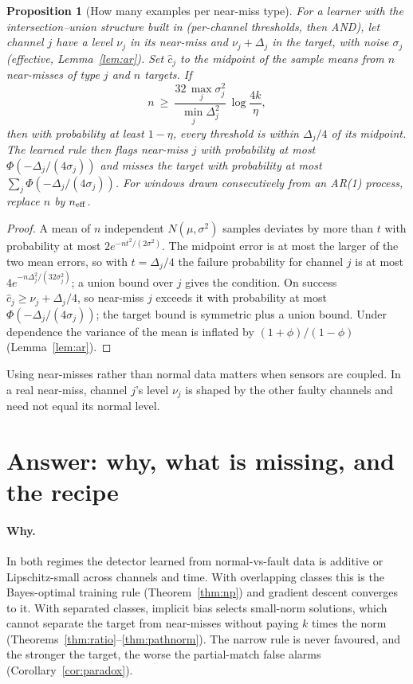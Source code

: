 \documentclass[11pt]{article}
\newtheorem{proposition}[theorem]{Proposition}
\theoremstyle{definition}
\theoremstyle{remark}
\newcommand{\1}{\mathbf{1}}
\begin{document}
\begin{proposition}[How many examples per near-miss type]\label{prop:samples}
For a learner with the intersection--union structure built in (per-channel thresholds, then AND), let channel $j$ have a level $\nu_j$ in its near-miss and $\nu_j+\Delta_j$ in the target, with noise $\sigma_j$ (effective, Lemma~\ref{lem:ar}). Set $\hat c_j$ to the midpoint of the sample means from $n$ near-misses of type $j$ and $n$ targets. If
\[
n\ \ge\ \frac{32\,\max_j\sigma_j^2}{\min_j\Delta_j^2}\,\log\frac{4k}{\eta},
\]
then with probability at least $1-\eta$, every threshold is within $\Delta_j/4$ of its midpoint. The learned rule then flags near-miss $j$ with probability at most $\Phi(-\Delta_j/(4\sigma_j))$ and misses the target with probability at most $\sum_j\Phi(-\Delta_j/(4\sigma_j))$. For windows drawn consecutively from an AR(1) process, replace $n$ by $n_{\rm eff}$.
\end{proposition}
\begin{proof}
A mean of $n$ independent $N(\mu,\sigma^2)$ samples deviates by more than $t$ with probability at most $2e^{-nt^2/(2\sigma^2)}$. The midpoint error is at most the larger of the two mean errors, so with $t=\Delta_j/4$ the failure probability for channel $j$ is at most $4e^{-n\Delta_j^2/(32\sigma_j^2)}$; a union bound over $j$ gives the condition. On success $\hat c_j\ge\nu_j+\Delta_j/4$, so near-miss $j$ exceeds it with probability at most $\Phi(-\Delta_j/(4\sigma_j))$; the target bound is symmetric plus a union bound. Under dependence the variance of the mean is inflated by $(1+\phi)/(1-\phi)$ (Lemma~\ref{lem:ar}).
\end{proof}
Using near-misses rather than normal data matters when sensors are coupled. In a real near-miss, channel $j$'s level $\nu_j$ is shaped by the other faulty channels and need not equal its normal level.

\section{Answer: why, what is missing, and the recipe}
\paragraph{Why.} In both regimes the detector learned from normal-vs-fault data is additive or Lipschitz-small across channels and time. With overlapping classes this is the Bayes-optimal training rule (Theorem~\ref{thm:np}) and gradient descent converges to it. With separated classes, implicit bias selects small-norm solutions, which cannot separate the target from near-misses without paying $k$ times the norm (Theorems~\ref{thm:ratio}--\ref{thm:pathnorm}). The narrow rule is never favoured, and the stronger the target, the worse the partial-match false alarms (Corollary~\ref{cor:paradox}).
\end{document}
